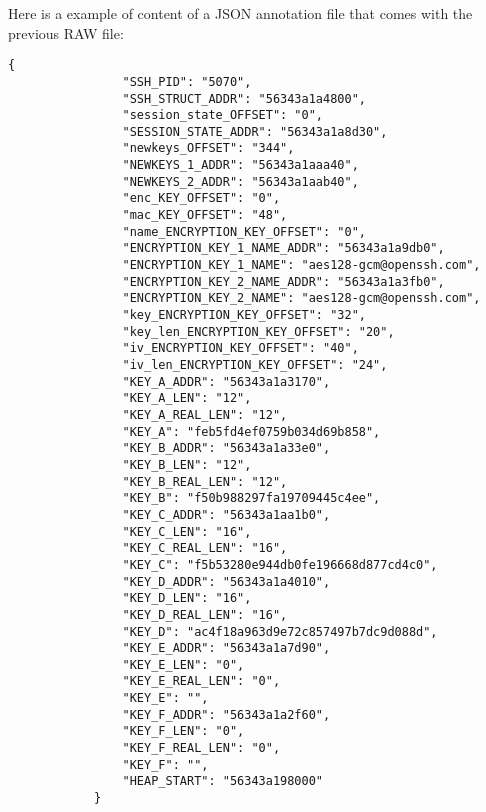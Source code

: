     \begin{minipage}{\dimexpr\linewidth-20pt}
         Here is a example of content of a JSON annotation file that comes with the previous RAW file:

        \begin{lstlisting}[style=json, caption={Complete JSON example, from \textit{Training/basic/V\_7\_8\_P1/16/5070-1643978841.json}}, label={lst:json-annotation-ex-1}]
            {
                "SSH_PID": "5070",
                "SSH_STRUCT_ADDR": "56343a1a4800",
                "session_state_OFFSET": "0",
                "SESSION_STATE_ADDR": "56343a1a8d30",
                "newkeys_OFFSET": "344",
                "NEWKEYS_1_ADDR": "56343a1aaa40",
                "NEWKEYS_2_ADDR": "56343a1aab40",
                "enc_KEY_OFFSET": "0",
                "mac_KEY_OFFSET": "48",
                "name_ENCRYPTION_KEY_OFFSET": "0",
                "ENCRYPTION_KEY_1_NAME_ADDR": "56343a1a9db0",
                "ENCRYPTION_KEY_1_NAME": "aes128-gcm@openssh.com",
                "ENCRYPTION_KEY_2_NAME_ADDR": "56343a1a3fb0",
                "ENCRYPTION_KEY_2_NAME": "aes128-gcm@openssh.com",
                "key_ENCRYPTION_KEY_OFFSET": "32",
                "key_len_ENCRYPTION_KEY_OFFSET": "20",
                "iv_ENCRYPTION_KEY_OFFSET": "40",
                "iv_len_ENCRYPTION_KEY_OFFSET": "24",
                "KEY_A_ADDR": "56343a1a3170",
                "KEY_A_LEN": "12",
                "KEY_A_REAL_LEN": "12",
                "KEY_A": "feb5fd4ef0759b034d69b858",
                "KEY_B_ADDR": "56343a1a33e0",
                "KEY_B_LEN": "12",
                "KEY_B_REAL_LEN": "12",
                "KEY_B": "f50b988297fa19709445c4ee",
                "KEY_C_ADDR": "56343a1aa1b0",
                "KEY_C_LEN": "16",
                "KEY_C_REAL_LEN": "16",
                "KEY_C": "f5b53280e944db0fe196668d877cd4c0",
                "KEY_D_ADDR": "56343a1a4010",
                "KEY_D_LEN": "16",
                "KEY_D_REAL_LEN": "16",
                "KEY_D": "ac4f18a963d9e72c857497b7dc9d088d",
                "KEY_E_ADDR": "56343a1a7d90",
                "KEY_E_LEN": "0",
                "KEY_E_REAL_LEN": "0",
                "KEY_E": "",
                "KEY_F_ADDR": "56343a1a2f60",
                "KEY_F_LEN": "0",
                "KEY_F_REAL_LEN": "0",
                "KEY_F": "",
                "HEAP_START": "56343a198000"
            }
        \end{lstlisting}
    \end{minipage}

